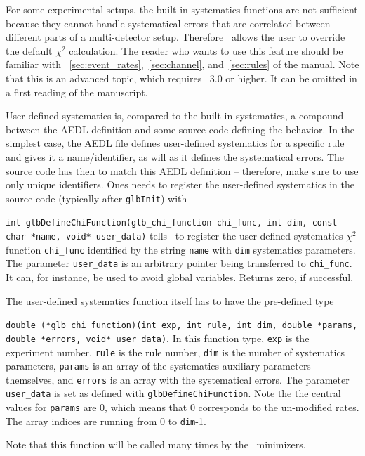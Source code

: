 For some experimental setups, the built-in systematics functions are not sufficient
because they cannot handle systematical errors that are correlated between different
parts of a multi-detector setup. Therefore \GLOBES\ allows the user
to override the default $\chi^2$ calculation. The reader who wants to use this
feature should be familiar with \Secs~\ref{sec:event_rates},~\ref{sec:channel}, and~\ref{sec:rules}
of the manual. Note that this is an advanced topic, which requires \GLOBES\ 3.0 or
higher. It can be omitted in a first reading of the manuscript.

User-defined systematics is, compared to the built-in systematics, a compound between
the AEDL definition and some source code defining the behavior. In the simplest case,
the AEDL file defines user-defined systematics for a specific rule and gives it a 
name/identifier,  as will as it defines the systematical errors. The source code has then to match this AEDL
definition -- therefore, make sure to use only unique identifiers. 
Ones needs to register the user-defined systematics in the 
source code (typically after {\tt glbInit}) with
\begin{function}
{\tt int glbDefineChiFunction(glb\_chi\_function chi\_func, int dim, const char *name, void* user\_data)}
 tells \GLOBES\ to register the user-defined systematics $\chi^2$ function {\tt chi\_func} 
identified by the string {\tt name} with {\tt dim} systematics parameters. The parameter {\tt user\_data}
is an arbitrary pointer being transferred to {\tt chi\_func}. It can, for instance, be used to avoid
global variables. Returns zero, if successful.
\end{function}
The user-defined systematics function itself has to have the pre-defined type 
\begin{function}
{\tt double (*glb\_chi\_function)(int exp, int rule, int dim, double *params, double *errors, void* user\_data)}.
In this function type, {\tt exp} is the experiment number, {\tt rule} is the rule number, {\tt dim} is the number of systematics parameters, {\tt params} is an array of the systematics auxiliary parameters themselves, and {\tt errors} is an array with the systematical errors. The parameter {\tt user\_data} is set as defined with
{\tt glbDefineChiFunction}.
Note the the central values for {\tt params} are $0$, which means that $0$ corresponds to the un-modified rates. The array indices are running from $0$ to {\tt dim}-1.
\end{function}
Note that this function will be called many times by the \GLOBES\ minimizers.
